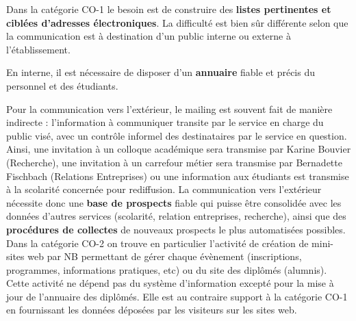 \documentclass{book}
\begin{document}
Dans la catégorie CO-1 le besoin est de construire des \textbf{listes 
pertinentes et ciblées d'adresses électroniques}. La difficulté
est bien sûr différente selon que la communication est à destination
d'un public interne ou externe à l'établissement.

En interne, il est nécessaire de disposer d'un \textbf{annuaire}
fiable et précis du personnel et des étudiants. 

Pour la communication  vers l'extérieur, le mailing est souvent  fait de manière
indirecte :  l'information à communiquer  transite par  le service en  charge du
public  visé, avec  un contrôle  informel des  destinataires par  le service  en
question.  Ainsi, une  invitation à  un colloque  académique sera  transmise par
Karine Bouvier (Recherche), une invitation  à un carrefour métier sera transmise
par  Bernadette  Fischbach  (Relations   Entreprises)  ou  une  information  aux
étudiants  est  transmise   à  la  scolarité  concernée   pour  rediffusion.  La
communication  vers l'extérieur  nécessite donc  une \textbf{base  de prospects}
fiable qui puisse être consolidée avec les données d'autres services (scolarité,
relation entreprises, recherche), ainsi que des \textbf{procédures de collectes}
de nouveaux prospects le plus automatisées possibles.\\

Dans  la catégorie  CO-2  on trouve  en particulier  l'activité  de création  de
mini-sites  web  par NB  permettant  de  gérer chaque  évènement  (inscriptions,
programmes,  informations pratiques,  etc) ou  du site  des diplômés  (alumnis).
Cette activité  ne dépend pas  du système d'information  excepté pour la  mise à
jour de  l'annuaire des diplômés. Elle  est au contraire support  à la catégorie
CO-1 en fournissant les données déposées par les visiteurs sur les sites web.\\
\end{document}
